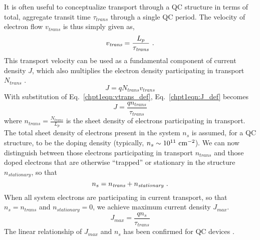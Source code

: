 {It is often useful to conceptualize transport through a QC structure in terms of total, aggregate transit time $\tau_\textit{trans}$ through a single QC period.  The velocity of electron flow $v_\textit{trans}$ is thus simply given as,
\begin{equation}
\label{chpt1eqn:vtrans_def}
v_\textit{trans}=\frac{L_p}{\tau_\textit{trans}} \textnormal{~.}
\end{equation}
This transport velocity can be used as a fundamental component of current density $J$, which also multiplies the electron density participating in transport $N_\textit{trans}$  \cite{Sze}.
\begin{equation}
\label{chpt1eqn:J_def}
J = q N_\textit{trans} v_\textit{trans}
\end{equation}
With substitution of Eq.~\eqref{chpt1eqn:vtrans_def}, Eq.~\eqref{chpt1eqn:J_def} becomes
\begin{equation}
J = \frac{q n_\textit{trans}}{\tau_\textit{trans}}
\end{equation}
where $n_\textit{trans} = \frac{N_\textit{trans}}{L_p}$  is the sheet density of electrons participating in transport.  The total sheet density of electrons present in the system $n_s$ is assumed, for a QC structure, to be the doping density (typically, $n_s\sim10^{11}~\textnormal{cm}^{-2}$).  We can now distinguish between those electrons participating in transport $n_\textit{trans}$ and those doped electrons that are otherwise ``trapped'' or stationary in the structure $n_\textit{stationary}$, so that
\begin{equation}
n_s = n_\textit{trans}+n_\textit{stationary} \textnormal{~.}
\end{equation}
When all system electrons are participating in current transport, so that $n_s=n_\textit{trans}$ and $n_\textit{stationary}=0$, we achieve maximum current density $J_{max}$.
\begin{equation}
J_{max}=\frac{q n_s}{\tau_\textit{trans}}
\end{equation}
The linear relationship of $J_{max}$ and $n_s$ has been confirmed for QC devices \cite{Aellen:JAP:2006} \cite{Howard:APL:2008}.

}
